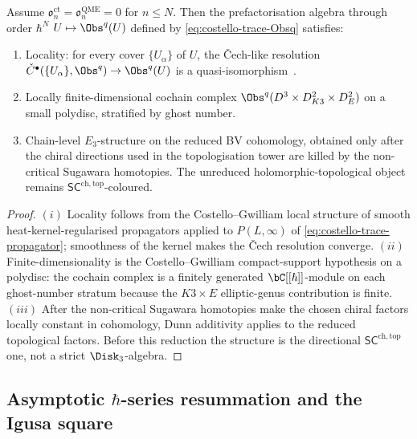 \begin{theorem}
\label{thm:costello-trace-Obsq-E3}
Assume \(\mathfrak{o}^{\mathrm{ct}}_n=\mathfrak{o}^{\mathrm{QME}}_n=0\)
for \(n\le N\). Then the prefactorisation algebra through order
\(\hbar^N\)
$U\mapsto\Obs^q(U)$ defined by \eqref{eq:costello-trace-Obsq}
satisfies:
\begin{enumerate}
\item[$(i)$] Locality: for every cover
$\{U_\alpha\}$ of $U$, the \v{C}ech-like resolution
$\check C^\bullet(\{U_\alpha\},\Obs^q)\to\Obs^q(U)$ is a
quasi-isomorphism~\cite[Definition 6.3.1,
Vol.~1]{CostelloGwilliam2017}.
\item[$(ii)$] Locally finite-dimensional cochain complex
$\Obs^q(D^3\times D^2_{K3}\times D^2_E)$ on a small polydisc,
stratified by ghost number.
\item[$(iii)$] Chain-level $E_3$-structure on the reduced BV cohomology,
obtained only after the chiral directions used in the
topologisation tower are killed by the non-critical Sugawara homotopies.
The unreduced holomorphic-topological object remains
\(\mathsf{SC}^{\mathrm{ch,top}}\)-coloured.
\end{enumerate}
\end{theorem}

\begin{proof}
$(i)$ Locality follows from the Costello--Gwilliam local structure of
smooth heat-kernel-regularised propagators
\cite[Theorem 9.1.2, Vol.~1]{CostelloGwilliam2017} applied to
$P(L,\infty)$ of \eqref{eq:costello-trace-propagator}; smoothness of
the kernel makes the \v{C}ech resolution converge.
$(ii)$ Finite-dimensionality is the Costello--Gwilliam compact-support
hypothesis \cite[\S 8.3, Vol.~1]{CostelloGwilliam2017} on a polydisc:
the cochain complex is a finitely generated
$\bC[[\hbar]]$-module on each ghost-number stratum because the
$K3\times E$ elliptic-genus contribution is finite.
$(iii)$ After the non-critical Sugawara homotopies make the chosen
chiral factors locally constant in cohomology, Dunn additivity applies
to the reduced topological factors. Before this reduction the structure
is the directional $\mathsf{SC}^{\mathrm{ch,top}}$ one, not a strict
\(\Disk_3\)-algebra.
\end{proof}

\subsection{Asymptotic $\hbar$-series resummation and the Igusa square}
\label{subsec:costello-trace-resummation}

